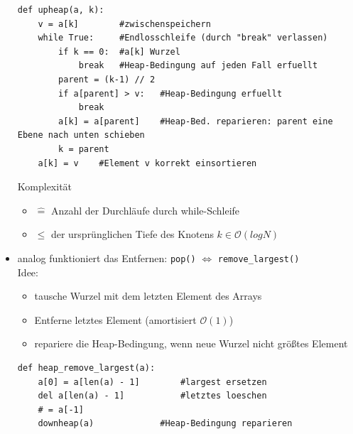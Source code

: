 \documentclass[11pt, fleqn]{scrreprt}
\newcommand{\bigO}[0]{\mathcal{O}}
\begin{document}
\begin{itemize}
\begin{verbatim}
def upheap(a, k):
    v = a[k]        #zwischenspeichern
    while True:     #Endlosschleife (durch "break" verlassen)
        if k == 0:  #a[k] Wurzel
            break   #Heap-Bedingung auf jeden Fall erfuellt
        parent = (k-1) // 2
        if a[parent] > v:   #Heap-Bedingung erfuellt
            break
        a[k] = a[parent]    #Heap-Bed. reparieren: parent eine Ebene nach unten schieben
        k = parent
    a[k] = v    #Element v korrekt einsortieren
        \end{verbatim}
        Komplexität
        \begin{itemize}[label={}]
            \item $\widehat{=}$ Anzahl der Durchläufe durch while-Schleife
            \item $\leq$ der ursprünglichen Tiefe des Knotens $ k \in \bigO{}(logN)$
        \end{itemize}
        \item analog funktioniert das Entfernen: \verb|pop()| $\Leftrightarrow$ \verb|remove_largest()| \\
        Idee:
        \begin{itemize}
            \item tausche Wurzel mit dem letzten Element des Arrays
            \item Entferne letztes Element (amortisiert $\bigO{}(1)$)
            \item repariere die Heap-Bedingung, wenn neue Wurzel nicht größtes Element
        \end{itemize}
        \begin{verbatim}
def heap_remove_largest(a):
    a[0] = a[len(a) - 1]        #largest ersetzen
    del a[len(a) - 1]           #letztes loeschen
    # = a[-1]
    downheap(a)             #Heap-Bedingung reparieren


\end{verbatim}
\end{itemize}
\end{document}
